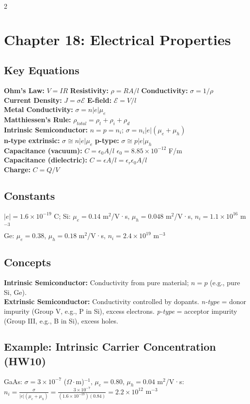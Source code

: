 \documentclass[8pt]{extarticle}
\begin{document}
\begin{multicols*}{2}
\section*{Chapter 18: Electrical Properties}
\subsection*{Key Equations}
\textbf{Ohm's Law:} $V=IR$ \quad \textbf{Resistivity:} $\rho=RA/l$ \quad \textbf{Conductivity:} $\sigma=1/\rho$ \\
\textbf{Current Density:} $J=\sigma\mathcal{E}$ \quad \textbf{E-field:} $\mathcal{E}=V/l$ \\
\textbf{Metal Conductivity:} $\sigma=n|e|\mu_e$ \\
\textbf{Matthiessen's Rule:} $\rho_{total}=\rho_t+\rho_i+\rho_d$ \\
\textbf{Intrinsic Semiconductor:} $n=p=n_i$; \; $\sigma = n_i|e|(\mu_e+\mu_h)$ \\
\textbf{n-type extrinsic:} $\sigma \cong n|e|\mu_e$ \quad \textbf{p-type:} $\sigma \cong p|e|\mu_h$ \\
\textbf{Capacitance (vacuum):} $C = \epsilon_0 A/l$ \quad $\epsilon_0=8.85\times10^{-12}$ F/m \\
\textbf{Capacitance (dielectric):} $C = \epsilon A/l = \epsilon_r \epsilon_0 A/l$ \\
\textbf{Charge:} $C=Q/V$
\subsection*{Constants}
$|e| = 1.6\times10^{-19}$ C; Si: $\mu_e=0.14$ m$^2$/V·s, $\mu_h=0.048$ m$^2$/V·s, $n_i=1.1\times10^{16}$ m$^{-3}$ \\
Ge: $\mu_e=0.38$, $\mu_h=0.18$ m$^2$/V·s, $n_i=2.4\times10^{19}$ m$^{-3}$
\subsection*{Concepts}
\textbf{Intrinsic Semiconductor:} Conductivity from pure material; $n=p$ (e.g., pure Si, Ge). \\
\textbf{Extrinsic Semiconductor:} Conductivity controlled by dopants. \textit{n-type} = donor impurity (Group V, e.g., P in Si), excess electrons. \textit{p-type} = acceptor impurity (Group III, e.g., B in Si), excess holes.
\subsection*{Example: Intrinsic Carrier Concentration (HW10)}
GaAs: $\sigma=3\times10^{-7}$ ($\Omega\cdot$m)$^{-1}$, $\mu_e=0.80$, $\mu_h=0.04$ m$^2$/V·s: \\
$n_i = \frac{\sigma}{|e|(\mu_e+\mu_h)} = \frac{3\times10^{-7}}{(1.6\times10^{-19})(0.84)} = 2.2\times10^{12}$ m$^{-3}$

\end{multicols*}
\end{document}
